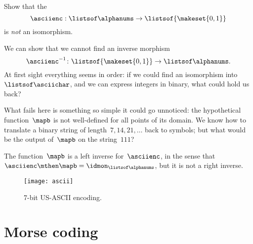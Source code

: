 \begin{exercise}
    Show that the \whomo
    \begin{equation}
        \label{eq:ascii-to-bin}
        \asciienc: \listsof\alphanums \to \listsof{\makeset{0,1}}
    \end{equation}
    is \emph{not} an isomorphism.
\end{exercise}
\begin{solution}
    We can show that we cannot find an inverse morphism
    \begin{equation}
        \label{eq:bin-to-ascii}
        \asciienc^{-1}\colon  \listsof{\makeset{0,1}} \to \listsof\alphanums.
    \end{equation}
    At first sight everything seems in order: if we could find an isomorphism into~$\listsof\asciichar$, and we can express integers in binary, what could hold us back?

    What fails here is something so simple it could go unnoticed: the hypothetical function~$\mapb$ is not well-defined for all points of its domain.
    We know how to translate a binary string of length~$7,14,21,\ldots$ back to symbols; but what would be the output of~$\mapb$ on the string~$111$?

    The function~$\mapb$ is a left inverse for~$\asciienc$, in the sense that~$\asciienc\mthen \mapb = \idmon_{\listsof\alphanums}$, but it is not a right inverse.

\end{solution}

\vfill
\begin{figure}[h]
    \texttt{[image: ascii]}
    \caption{7-bit US-ASCII encoding. \label{fig:asciifigure}}
\end{figure}

\section{Morse coding}

